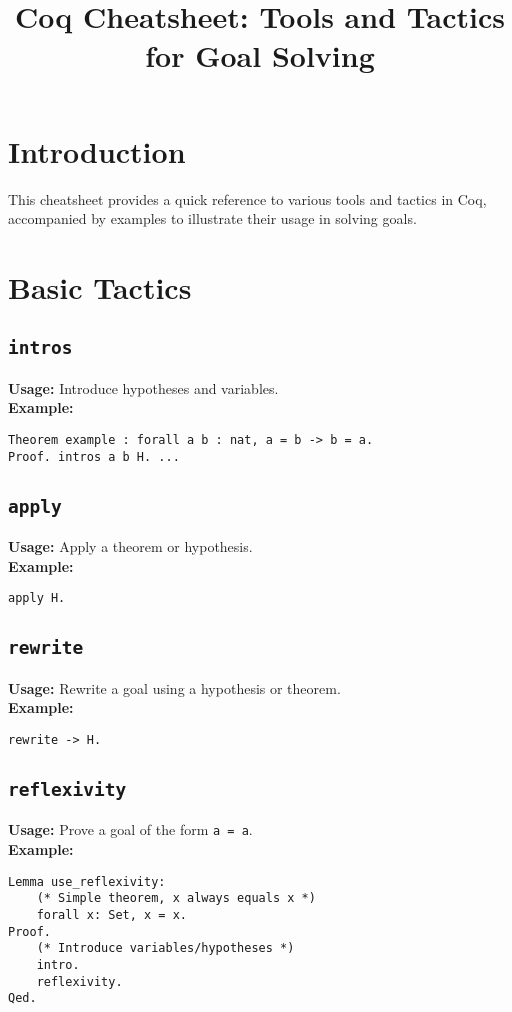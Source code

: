 \documentclass{article}
\title{Coq Cheatsheet: Tools and Tactics for Goal Solving}
\author{}
\date{}
\begin{document}
\maketitle

\section{Introduction}
This cheatsheet provides a quick reference to various tools and tactics in Coq, accompanied by examples to illustrate their usage in solving goals.

\section{Basic Tactics}
\subsection{\texttt{intros}}
\textbf{Usage:} Introduce hypotheses and variables. \\
\textbf{Example:}
\begin{lstlisting}[language=Coq]
Theorem example : forall a b : nat, a = b -> b = a.
Proof. intros a b H. ...
\end{lstlisting}

\subsection{\texttt{apply}}
\textbf{Usage:} Apply a theorem or hypothesis. \\
\textbf{Example:}
\begin{lstlisting}[language=Coq]
apply H.
\end{lstlisting}

\subsection{\texttt{rewrite}}
\textbf{Usage:} Rewrite a goal using a hypothesis or theorem. \\
\textbf{Example:}
\begin{lstlisting}[language=Coq]
rewrite -> H.
\end{lstlisting}

\subsection{\texttt{reflexivity}}
\textbf{Usage:} Prove a goal of the form \texttt{a = a}. \\
\textbf{Example:}
\begin{lstlisting}[language=Coq]
    Lemma use_reflexivity:
    (* Simple theorem, x always equals x *)
    forall x: Set, x = x.
Proof.
    (* Introduce variables/hypotheses *)
    intro.
    reflexivity.
Qed.
\end{lstlisting}
\end{document}
